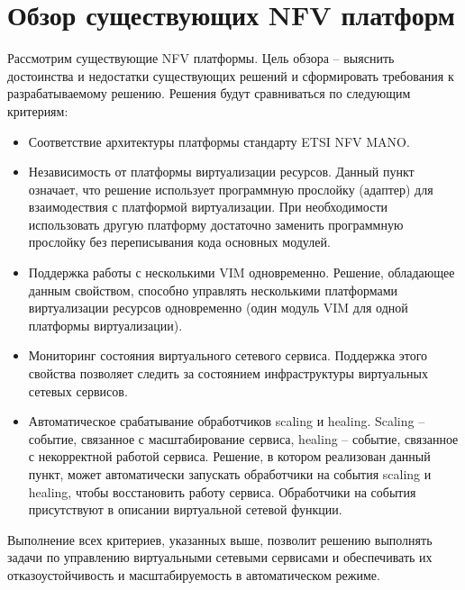 \documentclass[oneside,final,14pt,a4paper]{extreport}
\begin{document}
\chapter{Обзор существующих NFV платформ}
\label{nfv_platform_overview}
Рассмотрим существующие NFV платформы. Цель обзора -- выяснить достоинства и недостатки существующих решений и сформировать требования к разрабатываемому решению. Решения будут сравниваться по следующим критериям:
\begin{itemize}
	\item Соответствие архитектуры платформы стандарту ETSI NFV MANO.
	\item Независимость от платформы виртуализации ресурсов. Данный пункт означает, что решение использует программную прослойку (адаптер) для взаимодествия с платформой виртуализации. При необходимости использовать другую платформу достаточно заменить программную прослойку без переписывания кода основных модулей.
	\item Поддержка работы с несколькими VIM одновременно. Решение, обладающее данным свойством, способно управлять несколькими платформами виртуализации ресурсов одновременно (один модуль VIM для одной платформы виртуализации).
	\item Мониторинг состояния виртуального сетевого сервиса. Поддержка этого свойства позволяет следить за состоянием инфраструктуры виртуальных сетевых сервисов.
	\item Автоматическое срабатывание обработчиков scaling и healing. Scaling -- событие, связанное с масштабирование сервиса, healing -- событие, связанное с некорректной работой сервиса. Решение, в котором реализован данный пункт, может автоматически запускать обработчики на события scaling и healing, чтобы восстановить работу сервиса. Обработчики на события присутствуют в описании виртуальной сетевой функции.
\end{itemize}

Выполнение всех критериев, указанных выше, позволит решению выполнять задачи по управлению виртуальными сетевыми сервисами и обеспечивать их отказоустойчивость и масштабируемость в автоматическом режиме.
\end{document}
